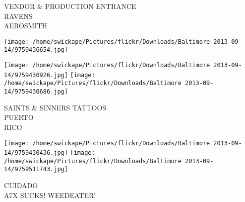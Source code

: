 \documentclass[10pt,letterpaper]{article}
\begin{document}
VENDOR \& PRODUCTION ENTRANCE\\
RAVENS\\
AEROSMITH
\pagebreak

\texttt{[image: /home/swickape/Pictures/flickr/Downloads/Baltimore 2013-09-14/9759436654.jpg]}

\vspace{0.25in}
\texttt{[image: /home/swickape/Pictures/flickr/Downloads/Baltimore 2013-09-14/9759430926.jpg]}
\texttt{[image: /home/swickape/Pictures/flickr/Downloads/Baltimore 2013-09-14/9759430686.jpg]}

SAINTS \& SINNERS TATTOOS\\
PUERTO\\
RICO
\pagebreak

\texttt{[image: /home/swickape/Pictures/flickr/Downloads/Baltimore 2013-09-14/9759430436.jpg]}
\texttt{[image: /home/swickape/Pictures/flickr/Downloads/Baltimore 2013-09-14/9759511743.jpg]}

CUIDADO\\
A7X SUCKS!  WEEDEATER!
\pagebreak
\end{document}
